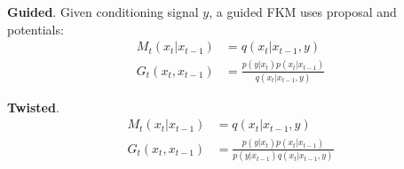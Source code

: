 \textbf{Guided}. Given conditioning signal $y$, a guided FKM uses proposal and potentials:
\begin{align}
    M_t(x_t|x_{t-1})&=q(x_t|x_{t-1},y) \\ G_t(x_t,x_{t-1}) &= \tfrac{p(y|x_{t})p(x_t|x_{t-1})}{q(x_t|x_{t-1},y)}
\end{align}

\textbf{Twisted}.
\begin{align}
    M_t(x_t|x_{t-1})&=q(x_t|x_{t-1},y) \\ G_t(x_t,x_{t-1}) &= \tfrac{p(y|x_{t})p(x_t|x_{t-1})}{p(y|x_{t-1})q(x_t|x_{t-1},y)}
\end{align}